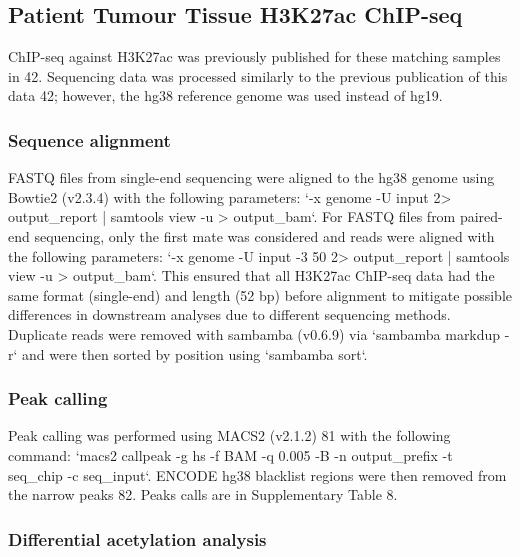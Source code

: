 \subsection{Patient Tumour Tissue H3K27ac ChIP-seq}

ChIP-seq against H3K27ac was previously published for these matching samples in 42.
Sequencing data was processed similarly to the previous publication of this data 42; however, the hg38 reference genome was used instead of hg19.

\subsubsection{Sequence alignment}

FASTQ files from single-end sequencing were aligned to the hg38 genome using Bowtie2 (v2.3.4) with the following parameters: `-x {genome} -U {input} 2> {output_report} | samtools view -u > {output_bam}`.
For FASTQ files from paired-end sequencing, only the first mate was considered and reads were aligned with the following parameters: `-x {genome} -U {input} -3 50 2> {output_report} | samtools view -u > {output_bam}`.
This ensured that all H3K27ac ChIP-seq data had the same format (single-end) and length (52 bp) before alignment to mitigate possible differences in downstream analyses due to different sequencing methods.
Duplicate reads were removed with sambamba (v0.6.9) via `sambamba markdup -r` and were then sorted by position using `sambamba sort`.

\subsubsection{Peak calling}

Peak calling was performed using MACS2 (v2.1.2) 81 with the following command: `macs2 callpeak -g hs -f BAM -q 0.005 -B -n {output_prefix} -t {seq_chip} -c {seq_input}`.
ENCODE hg38 blacklist regions were then removed from the narrow peaks 82.
Peaks calls are in Supplementary Table 8.

\subsubsection{Differential acetylation analysis}

